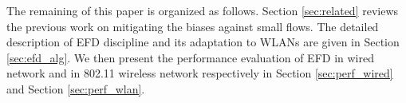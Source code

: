 \documentclass[preprint,12pt]{elsarticle}
\begin{document}

The remaining of this paper is organized as follows. Section \ref{sec:related} reviews the previous work on mitigating the biases against small flows. The detailed description of EFD discipline and its adaptation to WLANs are given in Section \ref{sec:efd_alg}. We then present the performance evaluation of EFD in wired network and in 802.11 wireless network respectively in Section \ref{sec:perf_wired} and Section \ref{sec:perf_wlan}.  


\end{document}
